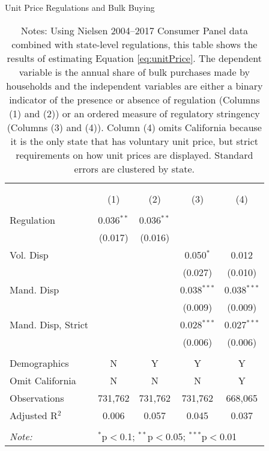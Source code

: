 \begin{table}[!htbp] \centering
  \caption{Unit Price Regulations and Bulk Buying}
  \label{tab:unitPriceLaw}
\begin{tabular}{@{\extracolsep{5pt}}lcccc}
\\[-1.8ex]\hline
\hline \\[-1.8ex]
\\[-1.8ex] & (1) & (2) & (3) & (4)\\
\hline \\[-1.8ex]
 Regulation & 0.036$^{**}$ & 0.036$^{**}$ &  &  \\
  & (0.017) & (0.016) &  &  \\
  Vol. Disp &  &  & 0.050$^{*}$ & 0.012 \\
  &  &  & (0.027) & (0.010) \\
  Mand. Disp &  &  & 0.038$^{***}$ & 0.038$^{***}$ \\
  &  &  & (0.009) & (0.009) \\
  Mand. Disp, Strict &  &  & 0.028$^{***}$ & 0.027$^{***}$ \\
  &  &  & (0.006) & (0.006) \\
 \hline \\[-1.8ex]
Demographics & N & Y & Y & Y \\
Omit California & N & N & N & Y \\
Observations & 731,762 & 731,762 & 731,762 & 668,065 \\
Adjusted R$^{2}$ & 0.006 & 0.057 & 0.045 & 0.037 \\
\hline
\hline \\[-1.8ex]
\textit{Note:}  & \multicolumn{4}{l}{$^{*}$p$<$0.1; $^{**}$p$<$0.05; $^{***}$p$<$0.01} \\
\end{tabular}
\caption*{Notes: Using Nielsen 2004--2017 Consumer Panel data combined with state-level regulations, this table shows the results of estimating Equation \ref{eq:unitPrice}. The dependent variable is the annual share of bulk purchases made by households and the independent variables are either a binary indicator of the presence or absence of regulation (Columns (1) and (2)) or an ordered measure of regulatory stringency (Columns (3) and (4)). Column (4) omits California because it is the only state that has voluntary unit price, but strict requirements on how unit prices are displayed. Standard errors are clustered by state.}
\end{table}
